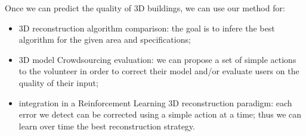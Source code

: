 \documentclass[../main.tex]{subfiles}
\begin{document}
    Once we can predict the quality of 3D buildings, we can use our method for:
    \begin{itemize}
        \item 3D reconstruction algorithm comparison: the goal is to infere the best algorithm for the given area and specifications;
        \item 3D model Crowdsourcing evaluation: we can propose a set of simple actions to the volunteer in order to correct their model and/or evaluate users on the quality of their input;
        \item integration in a Reinforcement Learning 3D reconstruction paradigm: each error we detect can be corrected using a simple action at a time; thus we can learn over time the best reconstruction strategy.
    \end{itemize}
\end{document}
